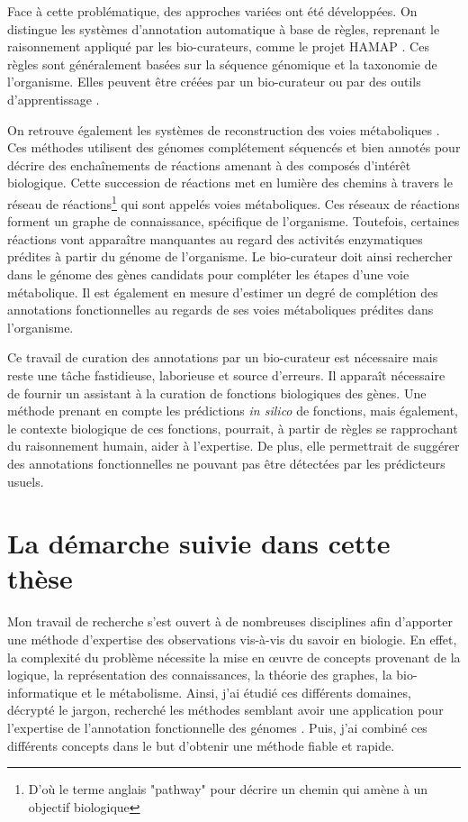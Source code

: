 \begin{refsegment}
Face à cette problématique, des approches variées ont été développées. On distingue les systèmes d'annotation automatique à base de règles, reprenant le raisonnement appliqué par les bio-curateurs, comme le projet \gls{HAMAP} \cite{lima2009hamap}. Ces règles sont généralement basées sur la séquence génomique et la taxonomie de l'organisme. Elles peuvent être créées par un bio-curateur ou par des outils d'apprentissage \cite{uniprot2011ongoing}.

On retrouve également les systèmes de reconstruction des voies métaboliques \cite{karpe2011pathway}. Ces méthodes utilisent des génomes complétement séquencés et bien annotés pour décrire des enchaînements de réactions amenant à des composés d'intérêt biologique.  Cette succession de réactions met en lumière des chemins à travers le réseau de réactions\footnote{D'où le terme anglais "pathway" pour décrire un chemin qui amène à un objectif biologique} qui sont appelés voies métaboliques. Ces réseaux de réactions forment un graphe de connaissance, spécifique de l'organisme. Toutefois, certaines réactions vont apparaître manquantes au regard des activités enzymatiques prédites à partir du génome de l'organisme. Le bio-curateur doit ainsi rechercher dans le génome des gènes candidats pour compléter les étapes d'une voie métabolique. Il est également en mesure d'estimer un degré de complétion des annotations fonctionnelles au regards de ses voies métaboliques prédites dans l'organisme.

Ce travail de curation des annotations par un bio-curateur est nécessaire mais reste une tâche fastidieuse, laborieuse et source d’erreurs. Il apparaît nécessaire de fournir un assistant à la curation de fonctions biologiques des gènes. Une méthode prenant en compte les prédictions \textit{in silico} de fonctions, mais également, le contexte biologique de ces fonctions, pourrait, à partir de règles se rapprochant du raisonnement humain, aider à l’expertise. De plus, elle permettrait de suggérer des annotations fonctionnelles ne pouvant pas être détectées par les prédicteurs usuels. 

\section*{La démarche suivie dans cette thèse}

Mon travail de recherche s'est ouvert à de nombreuses disciplines afin d'apporter une méthode d'expertise des observations vis-à-vis du savoir en biologie. En effet, la complexité du problème nécessite la mise en œuvre de concepts provenant de la logique, la représentation des connaissances, la théorie des graphes, la bio-informatique et le métabolisme. Ainsi, j'ai étudié ces différents domaines, décrypté le jargon, recherché les méthodes semblant avoir une application pour l'expertise de l'annotation fonctionnelle des génomes . Puis, j'ai combiné ces différents concepts dans le but d'obtenir une méthode fiable et rapide.


\end{refsegment}

